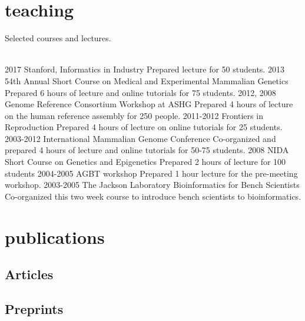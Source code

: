 \documentclass[]{dmc-cv} %
\begin{document}
\section{teaching}
Selected courses and lectures.\\
\\
\begin{entrylist}
\entry
{2017}
{Stanford, Informatics in Industry}
{}
{Prepared lecture for 50 students.}
\entry
{2013}
{54th Annual Short Course on Medical and Experimental Mammalian Genetics}
{ }
{Prepared 6 hours of lecture and online tutorials for 75 students.}
\entry
{2012, 2008}
{Genome Reference Consortium Workshop at ASHG}
{ }
{Prepared 4 hours of lecture on the human reference assembly for 250 people.}
\entry
{2011-2012}
{Frontiers in Reproduction}
{ }
{Prepared 4 hours of lecture on online tutorials for 25 students.}
\entry
{2003-2012}
{International Mammalian Genome Conference}
{ }
{Co-organized and prepared 4 hours of lecture and online tutorials for 50-75 students.}
\entry
{2008}
{NIDA Short Course on Genetics and Epigenetics}
{ }
{Prepared 2 hours of lecture for 100 students }
\entry
{2004-2005}
{AGBT workshop}
{ }
{Prepared 1 hour lecture for the pre-meeting workshop.}
\entry
{2003-2005}
{The Jackson Laboratory Bioinformatics for Bench Scientists}
{ }
{Co-organized this two week course to introduce bench scientists to bioinformatics.}
\end{entrylist}


\section{publications}
\subsection{Articles}
\printbibliography[type=article, heading=none]
\nocite{*}

\subsection{Preprints}
\printbibliography[type=unpublished, heading=none]
\nocite{*}

\end{document}
